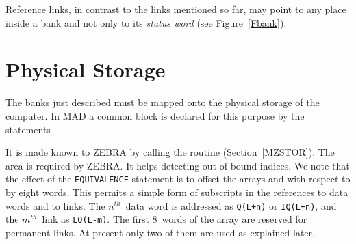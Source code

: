 Reference links, in contrast to the links mentioned so far,
may point to any place inside a bank and not only to its
{\em status word} (see Figure~\ref{Fbank}).
 
\section{Physical Storage}
\label{Sstor}
The banks just described must be mapped onto the physical storage
of the computer.
In MAD a common block is declared for this purpose by the statements

It is made known to ZEBRA by calling the routine 
(Section~\ref{MZSTOR}).
The area  is required by ZEBRA.
It helps detecting out-of-bound indices.
We note that the effect of the {\tt EQUIVALENCE} statement is to
offset the arrays  and  with respect to
 by eight words.
This permits a simple form of subscripts in the references to
data words and to links.
The $n^{th}$~data word is addressed as {\tt Q(L+n)} or
{\tt IQ(L+n)}, and the $m^{th}$~link as {\tt LQ(L-m)}.
The first 8~words of the array  are reserved for permanent
links.
At present only two of them are used as explained later.
 
